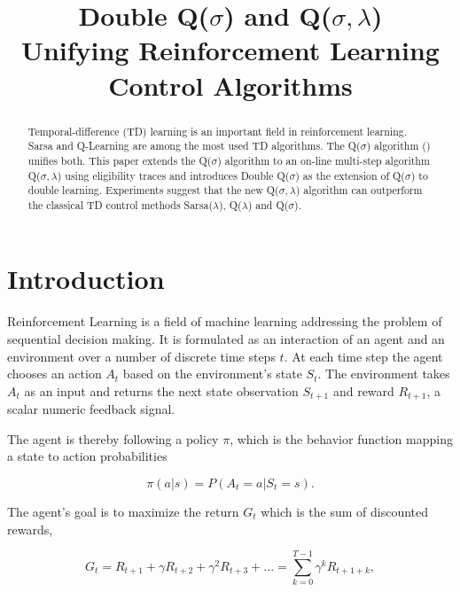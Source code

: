\documentclass{article} %
\title{Double Q($\sigma$) and Q($\sigma, \lambda$) \\ Unifying Reinforcement Learning Control Algorithms}
\begin{document}
\thispagestyle{empty}
\maketitle

\begin{abstract}
Temporal-difference (TD) learning is an important field in reinforcement learning. Sarsa and Q-Learning are among the most used TD algorithms. The Q($\sigma$) algorithm (\cite{sutton2017}) unifies both.
This paper extends the Q($\sigma$) algorithm to an on-line multi-step algorithm Q($\sigma, \lambda$) using eligibility traces and introduces Double Q($\sigma$) as the extension of Q($\sigma$) to double learning. 
Experiments suggest that the new Q($\sigma, \lambda$) algorithm can outperform the classical TD control methods Sarsa($\lambda$), Q($\lambda$) and Q($\sigma$).
\end{abstract}

\section{Introduction}

Reinforcement Learning is a field of machine learning addressing the problem of sequential decision making. It is formulated as an interaction of an agent and an environment over a number of discrete time steps $t$. At each time step the agent chooses an action $A_t$ based on the environment's state $S_t$. The environment takes $A_t$ as an input and returns the next state observation $S_{t+1}$ and reward $R_{t+1}$, a scalar numeric feedback signal.

The agent is thereby following a policy $\pi$, which is the behavior function mapping a state to action probabilities

\begin{equation} 
\pi(a | s) = P(A_t = a | S_t = s).
\end{equation}


The agent's goal is to maximize the return $G_t$ which is the sum of discounted rewards,

\begin{equation} 
G_t = R_{t+1} + \gamma R_{t+2} + \gamma^2 R_{t+3} + ... = \sum_{k=0}^{T-1} \gamma^k R_{t+1+k},
\end{equation}
\end{document}

